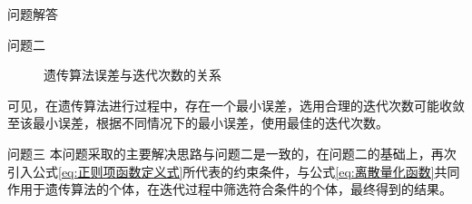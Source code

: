 \documentclass[11pt]{article}
\begin{document}
\begin{section}{问题解答}
\begin{subsection}{问题二}
\begin{figure}[H]
     \label{fig:t=3时遗传算法误差与迭代次数的关系}
     \caption{遗传算法误差与迭代次数的关系}
   \end{figure}
   可见，在遗传算法进行过程中，存在一个最小误差，选用合理的迭代次数可能收敛至该最小误差，根据不同情况下的最小误差，使用最佳的迭代次数。
 \end{subsection}
 \begin{subsection}{问题三}
   本问题采取的主要解决思路与问题二是一致的，在问题二的基础上，再次引入公式\ref{eq:正则项函数定义式}所代表的约束条件，与公式\ref{eq:离散量化函数}共同作用于遗传算法的个体，在迭代过程中筛选符合条件的个体，最终得到的结果。
   \begin{figure}[H]
     \graphicspath{{./fig/problem_3}}
     \centering

\end{figure}
\end{subsection}
\end{section}
\end{document}
